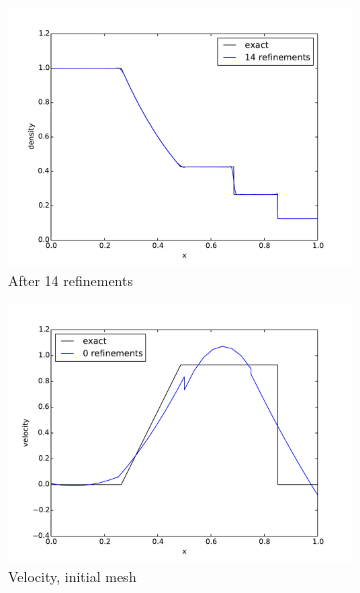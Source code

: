 \documentclass[preprint,12pt]{elsarticle}
\begin{document}
\begin{figure}[p]
\begin{subfigure}[c]{0.3\textwidth}
\includegraphics[width=\textwidth]{SpaceTimeCNS/Sod1e-5/den15.pdf}
\caption{After 14 refinements}
\label{fig:sod_den14}
\end{subfigure}
\begin{subfigure}[c]{0.3\textwidth}
\centering
\includegraphics[width=\textwidth]{SpaceTimeCNS/Sod1e-5/vel1.pdf}
\caption{Velocity, initial mesh}
\label{fig:sod_vel0}
\end{subfigure}
\begin{subfigure}[c]{0.3\textwidth}
\centering

\end{subfigure}
\end{figure}
\end{document}
